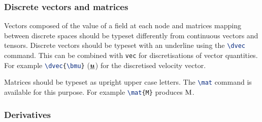 \subsubsection{Discrete vectors and matrices}

Vectors composed of the value of a field at each node and matrices mapping
between discrete spaces should be typeset differently from continuous
vectors and tensors. Discrete vectors should be typeset with an underline
using the \lstinline[language=TeX]+\dvec+ command. This can be combined with
\lstinline[language=TeX]+vec+ for discretisations of vector quantities. For
example \lstinline[language=TeX]+\dvec{\bmu}+ ($\underline{{\mbox{\boldmath$u$}}}$) for the
discretised velocity vector.

Matrices should be typeset as upright upper case letters. The
\lstinline[language=TeX]+\mat+ command is available for this purpose. For
example \lstinline[language=TeX]+\mat{M}+ produces $\mathrm{M}$.

\subsubsection{Derivatives}

